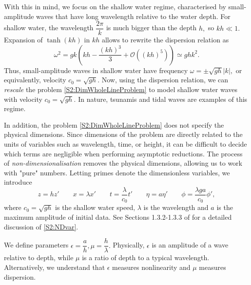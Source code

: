With this in mind, we focus on the shallow water regime, characterised by small-amplitude waves that have long wavelength relative to the water depth. For shallow water, the wavelength $\dfrac{2 \pi}k{}$ is much bigger than the depth $h,$ so $kh \ll 1.$ Expansion of $\tanh(kh)$ in $kh$ allows to rewrite the dispersion relation as
\[ \omega^2 = gk(kh - \frac{(kh)^3}{3} + \mathcal{O}((kh)^5))  \simeq ghk^2. \]
Thus, small-amplitude waves in shallow water have frequency $ \omega = \pm \sqrt{gh}|k|,$ or equivalently, velocity $c_0 = \sqrt{gh}.$ Now, using the dispersion relation, we can \textit{rescale} the problem \eqref{S2:DimWholeLineProblem} to model shallow water waves with velocity $c_0 = \sqrt{gh}.$ In nature, tsunamis and tidal waves are examples of this regime. 

In addition, the problem \eqref{S2:DimWholeLineProblem} does not specify the physical dimensions. Since dimensions of the problem are directly related to the units of variables such as wavelength, time, or height, it can be difficult to decide which terms are negligible when performing asymptotic reductions. The process of \textit{non-dimensionalisation} removes the physical dimensions, allowing us to work with "pure" numbers. Letting primes denote the dimensionless variables, we introduce
\begin{equation}\label{S2:NDvar}
z = hz' \qquad x = \lambda x' \qquad t = \frac{\lambda}{c_0}t' \qquad \eta = a \eta' \qquad \phi = \frac{\lambda g a}{c_0} \phi',
\end{equation}
where $c_0 = \sqrt{gh}$ is the shallow water speed, $\lambda$ is the wavelength and $a$ is the maximum amplitude of initial data. See Sections 1.3.2-1.3.3 of \cite{Lannes} for a detailed discussion of \eqref{S2:NDvar}. 

We define parameters $\epsilon = \dfrac{a}{h}, \mu = \dfrac{h}{\lambda}.$ Physically, $\epsilon$ is an amplitude of a wave relative to depth, while $\mu$ is a ratio of depth to a typical wavelength. Alternatively, we understand that $\epsilon$ measures nonlinearity and $\mu$ measures dispersion. 

